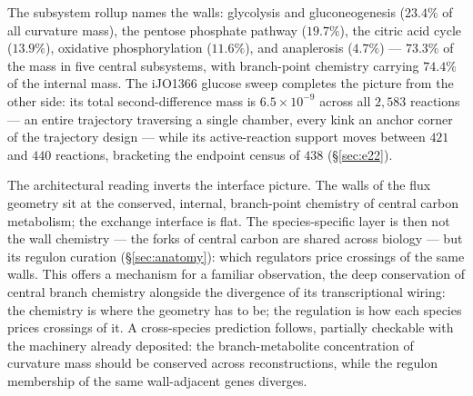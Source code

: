 The subsystem rollup names the walls: glycolysis and
gluconeogenesis ($23.4\%$ of all curvature mass), the pentose
phosphate pathway ($19.7\%$), the citric acid cycle ($13.9\%$),
oxidative phosphorylation ($11.6\%$), and anaplerosis ($4.7\%$)
--- $73.3\%$ of the mass in five central subsystems, with
branch-point chemistry carrying $74.4\%$ of the internal mass.
The iJO1366 glucose sweep completes the picture from the other
side: its total second-difference mass is $6.5 \times 10^{-9}$
across all $2{,}583$ reactions --- an entire trajectory traversing
a single chamber, every kink an anchor corner of the trajectory
design --- while its active-reaction support moves between $421$
and $440$ reactions, bracketing the endpoint census of $438$
(\S\ref{sec:e22}).

The architectural reading inverts the interface picture. The walls
of the flux geometry sit at the conserved, internal, branch-point
chemistry of central carbon metabolism; the exchange interface is
flat. The species-specific layer is then not the wall chemistry
--- the forks of central carbon are shared across biology --- but
its regulon curation (\S\ref{sec:anatomy}): which regulators price
crossings of the same walls. This offers a mechanism for a
familiar observation, the deep conservation of central branch
chemistry alongside the divergence of its transcriptional wiring:
the chemistry is where the geometry has to be; the regulation is
how each species prices crossings of it. A cross-species
prediction follows, partially checkable with the machinery
already deposited: the branch-metabolite concentration of
curvature mass should be conserved across reconstructions, while
the regulon membership of the same wall-adjacent genes diverges.
